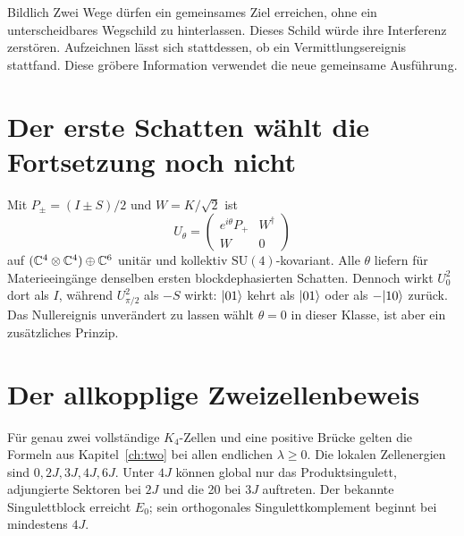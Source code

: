 \begin{bild}{Bildlich}
Zwei Wege dürfen ein gemeinsames Ziel erreichen, ohne ein unterscheidbares Wegschild zu hinterlassen. Dieses Schild würde ihre Interferenz zerstören. Aufzeichnen lässt sich stattdessen, ob ein Vermittlungsereignis stattfand. Diese gröbere Information verwendet die neue gemeinsame Ausführung.
\end{bild}

\section{Der erste Schatten wählt die Fortsetzung noch nicht}
Mit $P_\pm=(I\pm S)/2$ und $W=K/\sqrt2$ ist
\begin{equation}
U_\theta=\begin{pmatrix}e^{i\theta}P_+&W^\dagger\\W&0\end{pmatrix}
\end{equation}
auf $(\mathbb C^4\otimes\mathbb C^4)\oplus\mathbb C^6$ unitär und kollektiv $\mathrm{SU}(4)$-kovariant. Alle $\theta$ liefern für Materieeingänge denselben ersten blockdephasierten Schatten. Dennoch wirkt $U_0^2$ dort als $I$, während $U_{\pi/2}^2$ als $-S$ wirkt: $\lvert01\rangle$ kehrt als $\lvert01\rangle$ oder als $-\lvert10\rangle$ zurück. Das Nullereignis unverändert zu lassen wählt $\theta=0$ in dieser Klasse, ist aber ein zusätzliches Prinzip.

\section{Der allkopplige Zweizellenbeweis}
Für genau zwei vollständige $K_4$-Zellen und eine positive Brücke gelten die Formeln aus Kapitel~\ref{ch:two} bei allen endlichen $\lambda\ge0$. Die lokalen Zellenergien sind $0,2J,3J,4J,6J$. Unter $4J$ können global nur das Produktsingulett, adjungierte Sektoren bei $2J$ und die 20 bei $3J$ auftreten. Der bekannte Singulettblock erreicht $E_0$; sein orthogonales Singulettkomplement beginnt bei mindestens $4J$.

